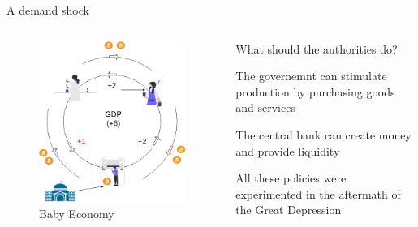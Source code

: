 \begin{frame}{A demand shock}
\begin{columns}[T]
\begin{column}{0.48\textwidth}
\begin{overprint}

\begin{figure}
\centering
\includegraphics[width=1\textwidth,height=\textheight]{assets/circular_keynes_liquidity.png}
\caption{Baby Economy}
\end{figure}

\end{overprint}
\end{column}

\begin{column}{0.48\textwidth}

What should the authorities do?


The governemnt can stimulate production by purchasing goods and services


The central bank can create money and provide liquidity


All these policies were experimented in the aftermath of the Great
Depression
\end{column}
\end{columns}
\end{frame}

